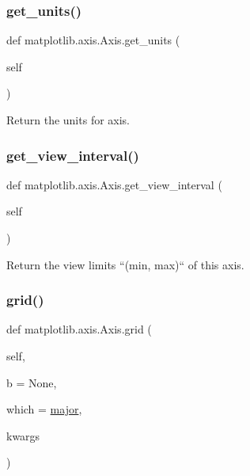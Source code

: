 \mbox{\label{classmatplotlib_1_1axis_1_1Axis_acac9660939c5ae994518831b421d9957}} 
\subsubsection{\texorpdfstring{get\+\_\+units()}{get\_units()}}
{\footnotesize\ttfamily def matplotlib.\+axis.\+Axis.\+get\+\_\+units (\begin{DoxyParamCaption}\item[{}]{self }\end{DoxyParamCaption})}

\begin{DoxyVerb}Return the units for axis.\end{DoxyVerb}
 \mbox{\label{classmatplotlib_1_1axis_1_1Axis_a7f73b6c81a0f46a6024e757fbd0e6e09}} 
\subsubsection{\texorpdfstring{get\+\_\+view\+\_\+interval()}{get\_view\_interval()}}
{\footnotesize\ttfamily def matplotlib.\+axis.\+Axis.\+get\+\_\+view\+\_\+interval (\begin{DoxyParamCaption}\item[{}]{self }\end{DoxyParamCaption})}

\begin{DoxyVerb}Return the view limits ``(min, max)`` of this axis.\end{DoxyVerb}
 \mbox{\label{classmatplotlib_1_1axis_1_1Axis_a39bd336dbfc743de9eed3f82d294ff96}} 
\subsubsection{\texorpdfstring{grid()}{grid()}}
{\footnotesize\ttfamily def matplotlib.\+axis.\+Axis.\+grid (\begin{DoxyParamCaption}\item[{}]{self,  }\item[{}]{b = {\ttfamily None},  }\item[{}]{which = {\ttfamily \textquotesingle{}\hyperlink{classmatplotlib_1_1axis_1_1Axis_a349fa77c014c5e44f472634075372df2}{major}\textquotesingle{}},  }\item[{}]{kwargs }\end{DoxyParamCaption})}

